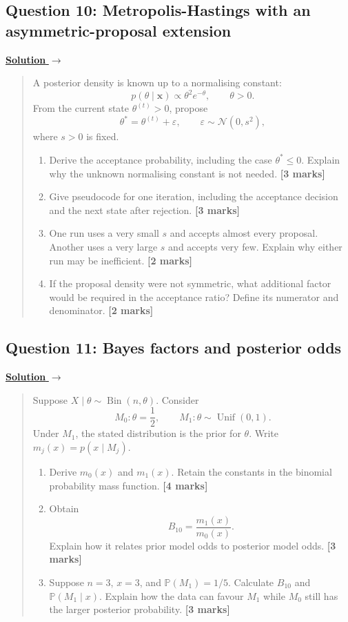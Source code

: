 \documentclass[11pt,a4paper]{article}
\newcommand{\given}{\mathrel{|}}
\newcommand{\xvec}{\boldsymbol{x}}
\newenvironment{examquestion}[2]
  {\subsection{#1}\label{question:\arabic{subsection}}\label{#2}%
   \noindent\hyperref[answer:\arabic{subsection}]{\textbf{Solution} $\rightarrow$}%
   \begin{quote}\color{statgrey}}
  {\end{quote}}
\begin{document}
\clearpage

\begin{examquestion}{Question 10: Metropolis-Hastings with an asymmetric-proposal extension}{question:practice-metropolis-hastings-with-an-asymmetric-proposal-extension}
A posterior density is known up to a normalising constant:
\[
  p(\theta\given\xvec)\propto\theta^2e^{-\theta},
  \qquad \theta>0.
\]
From the current state $\theta^{(t)}>0$, propose
\[
  \theta^*=\theta^{(t)}+\varepsilon,
  \qquad
  \varepsilon\sim\mathcal{N}(0,s^2),
\]
where $s>0$ is fixed.

\begin{enumerate}[label=(\alph*)]
  \item Derive the acceptance probability, including the case
        $\theta^*\leq0$. Explain why the unknown normalising constant is not
        needed. \textbf{[3 marks]}

  \item Give pseudocode for one iteration, including the acceptance decision
        and the next state after rejection. \textbf{[3 marks]}

  \item One run uses a very small $s$ and accepts almost every proposal.
        Another uses a very large $s$ and accepts very few. Explain why either
        run may be inefficient. \textbf{[2 marks]}

  \item If the proposal density were not symmetric, what additional factor
        would be required in the acceptance ratio? Define its numerator and
        denominator. \textbf{[2 marks]}
\end{enumerate}
\end{examquestion}

\clearpage

\begin{examquestion}{Question 11: Bayes factors and posterior odds}{question:practice-bayes-factors-and-posterior-odds}
Suppose $X\given\theta\sim\operatorname{Bin}(n,\theta)$. Consider
\[
  M_0:\theta=\frac12,
  \qquad
  M_1:\theta\sim\operatorname{Unif}(0,1).
\]
Under $M_1$, the stated distribution is the prior for $\theta$. Write
$m_j(x)=p(x\given M_j)$.

\begin{enumerate}[label=(\alph*)]
  \item Derive $m_0(x)$ and $m_1(x)$. Retain the constants in the binomial
        probability mass function. \textbf{[4 marks]}

  \item Obtain
        \[
          B_{10}=\frac{m_1(x)}{m_0(x)}.
        \]
        Explain how it relates prior model odds to posterior model odds.
        \textbf{[3 marks]}

  \item Suppose $n=3$, $x=3$, and $\mathbb{P}(M_1)=1/5$. Calculate $B_{10}$
        and $\mathbb{P}(M_1\given x)$. Explain how the data can favour $M_1$
        while $M_0$ still has the larger posterior probability.
        \textbf{[3 marks]}
\end{enumerate}
\end{examquestion}
\end{document}
